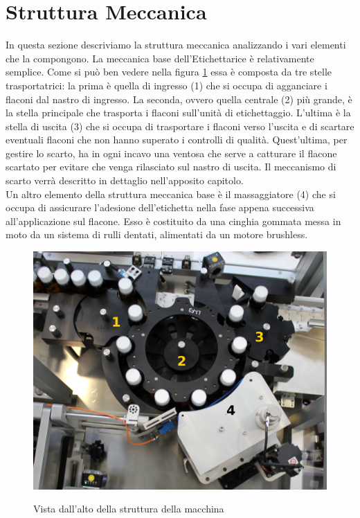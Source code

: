 \documentclass[12pt, a4paper, oneside]{book}
\begin{document}
\section{Struttura Meccanica}
In questa sezione descriviamo la struttura meccanica analizzando i vari elementi che la compongono.
La meccanica base dell'Etichettarice è relativamente semplice. Come si può ben vedere nella figura \ref{mec1} essa è composta da tre stelle trasportatrici: la prima è quella di ingresso (1) che si occupa di agganciare i flaconi dal nastro di ingresso. La seconda, ovvero quella centrale (2) più grande, è la stella principale che trasporta i flaconi sull'unità di etichettaggio. L'ultima è la stella di uscita (3) che si occupa di trasportare i flaconi verso l'uscita e di scartare eventuali flaconi che non hanno superato i controlli di qualità. Quest'ultima, per gestire lo scarto, ha in ogni incavo una ventosa che serve a catturare il flacone scartato per evitare che venga rilasciato sul nastro di uscita. Il meccanismo di scarto verrà descritto in dettaglio nell'apposito capitolo.
\\Un altro elemento della struttura meccanica base è il massaggiatore (4) che si occupa di assicurare l'adesione dell'etichetta nella fase appena successiva all'applicazione sul flacone. Esso è costituito da una cinghia gommata messa in moto da un sistema di rulli dentati, alimentati da un motore brushless.

\begin{figure}[H]
	\centering
	\includegraphics[width=12cm]{Immagini/MEC1}
	\label{mec1}
	\caption{ Vista dall'alto della struttura della macchina}
\end{figure}
\end{document}
